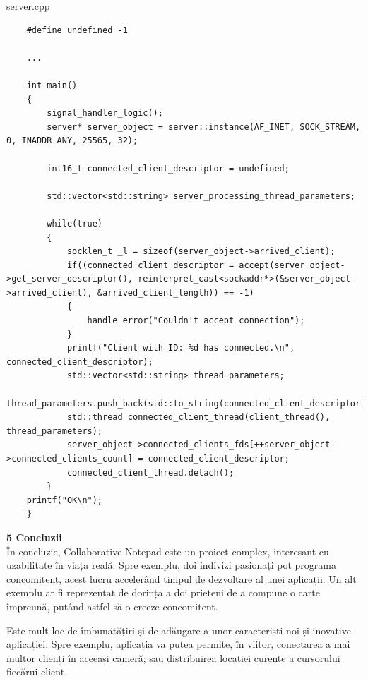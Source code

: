 \documentclass[runningheads]{llncs}
\begin{document}
{\large server.cpp}
\begin{tiny}
\begin{lstlisting}
    #define undefined -1

    ...

    int main()
    {
        signal_handler_logic();
        server* server_object = server::instance(AF_INET, SOCK_STREAM, 0, INADDR_ANY, 25565, 32);

        int16_t connected_client_descriptor = undefined;

        std::vector<std::string> server_processing_thread_parameters;

        while(true)
        {
            socklen_t _l = sizeof(server_object->arrived_client);
            if((connected_client_descriptor = accept(server_object->get_server_descriptor(), reinterpret_cast<sockaddr*>(&server_object->arrived_client), &arrived_client_length)) == -1)
            {
                handle_error("Couldn't accept connection");
            }
            printf("Client with ID: %d has connected.\n", connected_client_descriptor);
            std::vector<std::string> thread_parameters;
            thread_parameters.push_back(std::to_string(connected_client_descriptor));
            std::thread connected_client_thread(client_thread(), thread_parameters);
            server_object->connected_clients_fds[++server_object->connected_clients_count] = connected_client_descriptor;
            connected_client_thread.detach();
        }
    printf("OK\n");
    }
\end{lstlisting}
\end{tiny}
\newpage

{\Large \bf 5 Concluzii}
\\

În concluzie, Collaborative-Notepad este un proiect complex, interesant cu uzabilitate în viața reală. Spre exemplu, doi indivizi pasionați
pot programa concomitent, acest lucru accelerând timpul de dezvoltare al unei aplicații. Un alt exemplu ar fi reprezentat de dorința a doi prieteni
de a compune o carte împreună, putând astfel să o creeze concomitent.

Este mult loc de îmbunătățiri și de adăugare a unor caracteristi noi și inovative aplicației. Spre exemplu, aplicația va putea permite, în viitor,
conectarea a mai multor clienți în aceeași cameră; sau distribuirea locației curente a cursorului fiecărui client.
\\
\end{document}
